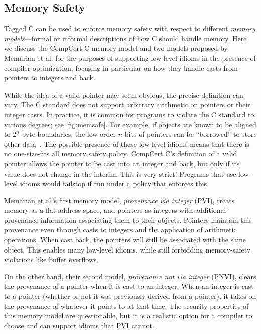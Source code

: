 \documentclass{llncs}
\begin{document}
\subsection{Memory Safety}
\label{sec:memsafe}

Tagged C can be used to enforce memory safety with respect to different {\em memory models}---formal
or informal descriptions of how C should handle memory. Here we discuss the CompCert C
memory model and two models proposed by Memarian et al. \cite{Memarian19:ExploringCSemantics}
for the purposes of supporting low-level idioms in the presence of compiler optimization, focusing in particular on how they handle
casts from pointers to integers and back.

While the idea of a valid pointer may seem obvious, the precise definition can vary. The C standard
does not support arbitrary arithmetic on pointers or their integer casts.  In practice, it is common for programs to violate the
C standard to various degrees; see \cref{fig:memsafe}. For example, if objects are known to be aligned to \(2^n\)-byte boundaries,
the low-order \(n\) bits of pointers can be ``borrowed'' to store other data~\cite{Memarian16:DeFacto}.
The possible presence of these low-level idioms means that there is no one-size-fits all memory safety policy.
CompCert C's definition of a valid pointer allows the pointer to be cast into an integer and back, but only if its value
does not change in the interim. This is very strict! Programs that use low-level idioms
would failstop if run under a policy that enforces this.

Memarian et al.'s first memory model, {\em provenance via integer} (PVI), treats memory
as a flat address space, and pointers as integers with additional provenance information
associating them to their objects. Pointers maintain this provenance even through casts to
integers and the application of arithmetic operations. When cast back, the pointers will still
be associated with the same object. This enables many low-level idioms, while still forbidding
memory-safety violations like buffer overflows.

On the other hand, their second model, {\em provenance not via integer} (PNVI), clears the
provenance of a pointer when it is cast to an integer. When an integer is cast to a pointer
(whether or not it was previously derived from a pointer), it takes on the provenance of whatever
it points to at that time. The security properties of this memory model are questionable, but
it is a realistic option for a compiler to choose and can support idioms that PVI cannot.
\end{document}
